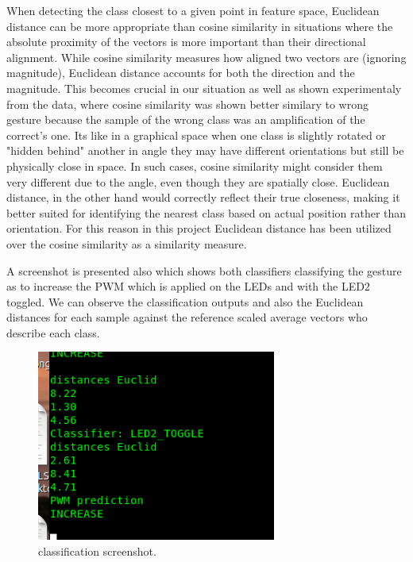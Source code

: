 \documentclass[a4paper,12pt]{article}
\begin{document}
	When detecting the class closest to a given point in feature space, 
	Euclidean distance can be more appropriate than cosine similarity in situations 
	where the absolute proximity of the vectors is more important than their directional alignment. 
	While cosine similarity measures how aligned two vectors are (ignoring magnitude), 
	Euclidean distance accounts for both the direction and the magnitude. 
	This becomes crucial in our situation as well as shown experimentaly from the data, 
	where cosine similarity was shown better similary to wrong gesture because the sample of 
	the wrong class was an amplification of the correct's one.
	Its like in a graphical space  when one class is slightly rotated or "hidden behind" 
	another in angle they may have different orientations but still be physically close in space. 
	In such cases, cosine similarity might consider them very different due to the angle, 
	even though they are spatially close. 
	Euclidean distance, in the other hand would correctly reflect their true closeness, 
	making it better suited for identifying the nearest class based on actual position rather than orientation.	
	For this reason in this project Euclidean distance has been utilized over the cosine similarity as a similarity measure.


	A screenshot is presented also which shows both classifiers classifying the gesture as to increase the PWM which is applied on
	the LEDs and with the LED2 toggled. We can observe the classification outputs and also the Euclidean distances for each sample
	against the reference scaled average vectors who describe each class.

	\begin{figure}[H]
			\centering
			\includegraphics[width=0.7\textwidth]{classification.png}
			\caption{classification screenshot.}
			\label{fig1:}
		\end{figure}		
\end{document}
